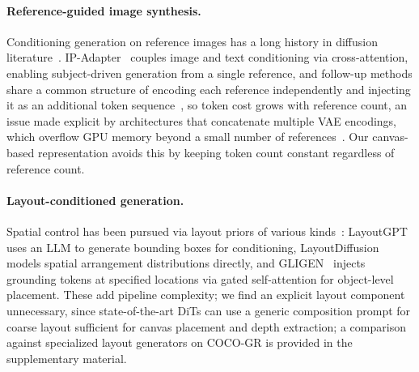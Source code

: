 \paragraph{Reference-guided image synthesis.}
Conditioning generation on reference images has a long history in diffusion literature~\cite{zhang2023adding,xverse2024,xiang2025instanceassemble,he2025dreamo,tang2024creatilayout,kumari2023multiconcept,ruiz2023dreambooth}.
IP-Adapter~\cite{ye2023ip} couples image and text conditioning via cross-attention, enabling subject-driven generation from a single reference, and follow-up methods share a common structure of encoding each reference independently and injecting it as an additional token sequence~\cite{wang2024instantid, li2024photomaker, ruiz2023dreambooth, kumari2023multiconcept}, so token cost grows with reference count, an issue made explicit by architectures that concatenate multiple VAE encodings, which overflow GPU memory beyond a small number of references~\cite{ye2023ip, wang2024msdiffusion, wu2025uno, xverse2024, xiao2024omnigen, omnigen2_2025}.
Our canvas-based representation avoids this by keeping token count constant regardless of reference count.

\paragraph{Layout-conditioned generation.}
Spatial control has been pursued via layout priors of various kinds~\cite{zhang2023adding, li2023gligen, feng2023layoutgpt, lian2023layoutdiffusion, zheng2023layoutdiffusion, tang2024creatilayout, xiang2025instanceassemble}: LayoutGPT~\cite{feng2023layoutgpt} uses an LLM to generate bounding boxes for conditioning, LayoutDiffusion~\cite{zheng2023layoutdiffusion} models spatial arrangement distributions directly, and GLIGEN~\cite{li2023gligen} injects grounding tokens at specified locations via gated self-attention for object-level placement.
These add pipeline complexity; we find an explicit layout component unnecessary, since state-of-the-art DiTs can use a generic composition prompt for coarse layout sufficient for canvas placement and depth extraction; a comparison against specialized layout generators on COCO-GR is provided in the supplementary material.

